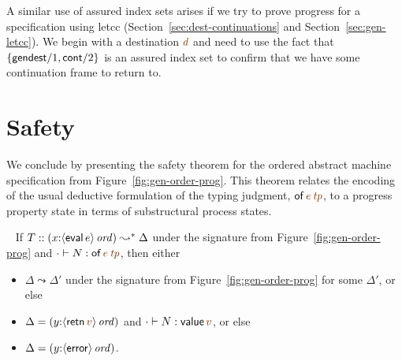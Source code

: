 A similar use of assured index sets arises if we try to prove progress
for a specification using letcc (Section~\ref{sec:dest-continuations}
and Section~\ref{sec:gen-letcc}). We begin with a destination
$\lf{d}$ and need to use the fact that $\{ {\sf gendest}/1, {\sf
  cont}/2 \}$ is an assured index set to confirm that we have some
continuation frame to return to. 

\section{Safety}

We conclude by presenting the safety theorem for the ordered abstract
machine specification from Figure~\ref{fig:gen-order-prog}. This
theorem relates the encoding of the usual deductive formulation of the
typing judgment, ${\sf of}\,\lf{e}\,\lf{{\it tp}}$, to a progress
property state in terms of substructural process states.

\bigskip
\begin{theorem}~
If $T :: (x{:}{\langle {{\sf eval}\,e} \rangle}\,{{\it ord}}) \leadsto^* \Delta$
under the signature from Figure~\ref{fig:gen-order-prog} and
$\cdot \vdash N : {\sf of}\,\lf{e}\,\lf{{\it tp}}$,
then either 
\begin{itemize}
\item $\Delta \leadsto \Delta'$ under the signature from
Figure~\ref{fig:gen-order-prog} for some $\Delta'$, or else
\item $\Delta = (y{:}\istrue{\susp{{\sf retn}\,\lf{v}}})$ and $\cdot \vdash N : {\sf value}\,\lf{v}$, or else
\item $\Delta = (y{:}{\langle {{\sf error}} \rangle}\,{{\it ord}})$.
\end{itemize}
\end{theorem}

